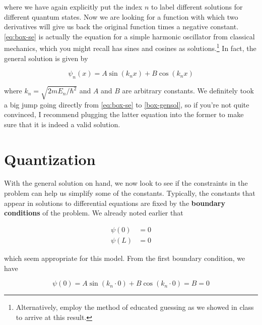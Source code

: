 \noindent where we have again explicitly put the index $n$ to label different solutions for different quantum states. 
Now we are looking for a function with which two derivatives will give us back the original function times a negative constant. 
\autoref{eq:box-se} is actually the equation for a simple harmonic oscillator from classical mechanics, which you might recall has sines and cosines as solutions.\footnote{Alternatively, employ the method of educated guessing as we showed in class to arrive at this result.} 
In fact, the general solution is given by 

\begin{tcolorbox}[title=General solution to particle in a box] \vspace{-2ex}
	\begin{equation}
		\psi_n(x) = A\sin(k_nx) + B\cos(k_nx) \label{box-gensol}
	\end{equation}
\end{tcolorbox}

\noindent where $k_n = \sqrt{2mE_n/\hbar^2}$ and $A$ and $B$ are arbitrary constants. 
We definitely took a big jump going directly from \autoref{eq:box-se} to \autoref{box-gensol}, so if you're not quite convinced, I recommend plugging the latter equation into the former to make sure that it is indeed a valid solution.


\section{Quantization}

With the general solution on hand, we now look to see if the constraints in the problem can help us simplify some of the constants. 
Typically, the constants that appear in solutions to differential equations are fixed by the \textbf{boundary conditions} of the problem. 
We already noted earlier that

\begin{align}
	\psi(0) &= 0 \\
	\psi(L) &= 0
\end{align}

\noindent which seem appropriate for this model. 
From the first boundary condition, we have

\begin{equation*}
	\psi(0) = A\sin(k_n \cdot 0) + B\cos(k_n \cdot 0) = B = 0
\end{equation*}

